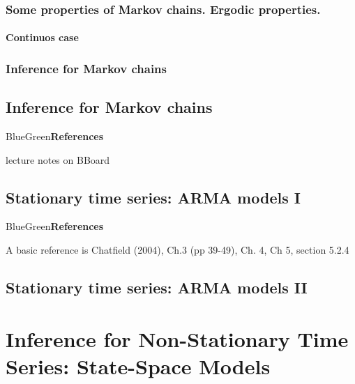 \documentclass[dvipsnames,12pt]{book}
\begin{document}
        \section{Some properties of Markov chains. Ergodic properties.}

            \subsection{Continuos case}

        \section{Inference for Markov chains}

    \chapter{Inference for Markov chains}

            \begin{mybox}{BlueGreen}{\textbf{References}}

                lecture notes on BBoard
                
            \end{mybox}

    \chapter{Stationary time series: ARMA models I}

            \begin{mybox}{BlueGreen}{\textbf{References}}

                A basic reference is Chatfield (2004), Ch.3 (pp 39-49), Ch. 4, Ch 5, section 5.2.4
                
            \end{mybox}

        

    \chapter{Stationary time series: ARMA models II}

        
        
    \part[Inference for Non-Stationary Time Series]{Inference for Non-Stationary Time Series: State-Space Models}
\end{document}
